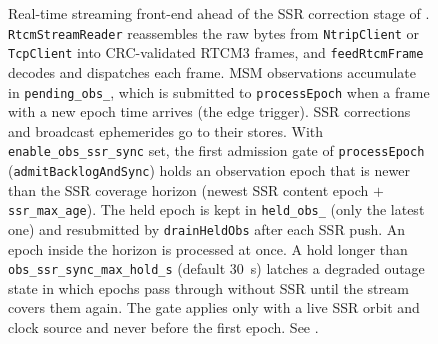 \documentclass[main.tex]{subfiles}
\begin{document}
\begin{figure}[tbp]
{}
\caption{Real-time streaming front-end ahead of the SSR correction stage of
. \texttt{RtcmStreamReader} reassembles the raw bytes
from \texttt{NtripClient} or \texttt{TcpClient} into CRC-validated RTCM3 frames,
and \texttt{feedRtcmFrame} decodes and dispatches each frame. MSM observations
accumulate in \texttt{pending\_obs\_}, which is submitted to
\texttt{processEpoch} when a frame with a new epoch time arrives (the edge
trigger). SSR corrections and broadcast ephemerides go to their stores. With
\texttt{enable\_obs\_ssr\_sync} set, the first admission gate of
\texttt{processEpoch} (\texttt{admitBacklogAndSync}) holds an observation epoch
that is newer than the SSR coverage horizon (newest SSR content epoch $+$
\texttt{ssr\_max\_age}). The held epoch is kept in \texttt{held\_obs\_} (only
the latest one) and resubmitted by \texttt{drainHeldObs} after each SSR push.
An epoch inside the horizon is processed at once. A hold longer than
\texttt{obs\_ssr\_sync\_max\_hold\_s} (default \SI{30}{s}) latches a degraded
outage state in which epochs pass through without SSR until the stream covers
them again. The gate applies only with a live SSR orbit and clock source and
never before the first epoch. See .}
\label{fig:rt-stream}
\end{figure}
\end{document}
